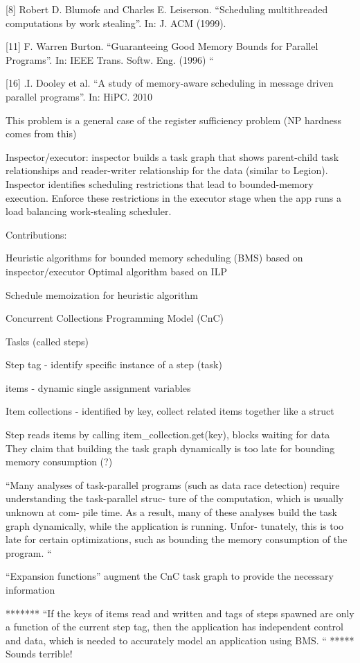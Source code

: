 \documentclass{article}
\begin{document}
[8] Robert D. Blumofe and Charles E. Leiserson. “Scheduling multithreaded computations by work stealing”. In: J. ACM (1999). 

[11] F. Warren Burton. “Guaranteeing Good Memory Bounds for Parallel Programs”. In: IEEE Trans. Softw. Eng. (1996) “

[16] 	.I. Dooley et al. “A study of memory-aware scheduling in message driven parallel programs”. In: HiPC. 2010  

This problem is a general case of the register sufficiency problem (NP hardness comes from this)

Inspector/executor: inspector builds a task graph that shows parent-child task relationships and reader-writer relationship for the data (similar to Legion).
Inspector identifies scheduling restrictions that lead to bounded-memory execution.  Enforce these restrictions in the executor stage when the app runs a load balancing work-stealing scheduler.

Contributions:


Heuristic algorithms for bounded memory scheduling (BMS) based on inspector/executor
Optimal algorithm based on ILP

Schedule memoization for heuristic algorithm

Concurrent Collections Programming Model (CnC)

Tasks (called steps)

Step tag - identify specific instance of a step (task)

items - dynamic single assignment variables

Item collections - identified by key, collect related items together like a struct

Step reads items by calling item\_collection.get(key), blocks waiting for data
They claim that building the task graph dynamically is too late for bounding memory consumption (?)

“Many analyses of task-parallel programs (such as data race detection) require understanding the task-parallel struc- ture of the computation, which is usually unknown at com- pile time. As a result, many of these analyses build the task graph dynamically, while the application is running. Unfor- tunately, this is too late for certain optimizations, such as bounding the memory consumption of the program. “

“Expansion functions” augment the CnC task graph to provide the necessary information

*******
“If the keys of items read and written and tags of steps spawned are only a function of the current step tag, then the application has independent control and data, which is needed to accurately model an application using BMS. “ *****
Sounds terrible!
\end{document}
